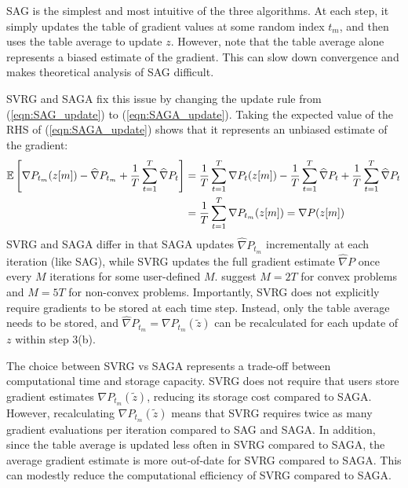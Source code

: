 SAG is the simplest and most intuitive of the three algorithms. At each step, it simply updates the table of gradient values at some random index $t_m$, and then uses the table average to update $z$. However, note that the table average alone represents a biased estimate of the gradient. This can slow down convergence and makes theoretical analysis of SAG difficult.

SVRG and SAGA fix this issue by changing the update rule from (\ref{eqn:SAG_update}) to (\ref{eqn:SAGA_update}). Taking the expected value of the RHS of (\ref{eqn:SAGA_update}) shows that it represents an unbiased estimate of the gradient:
%
\begin{align*}
    \mathbb{E}\left[\nabla P_{t_m}(z[m]) - \widehat \nabla P_{t_m} + \frac{1}{T} \sum_{t=1}^T \widehat \nabla P_{t} \right] &= \frac{1}{T} \sum_{t=1}^T \nabla P_{t}(z[m]) - \frac{1}{T} \sum_{t=1}^T \widehat \nabla P_{t} + \frac{1}{T} \sum_{t=1}^T \widehat \nabla P_{t} \\
    &= \frac{1}{T} \sum_{t=1}^T \nabla P_{t_m}(z[m]) = \nabla P(z[m])
\end{align*}
%
SVRG and SAGA differ in that SAGA updates $\widehat \nabla P_{t_m}$ incrementally at each iteration (like SAG), while SVRG updates the full gradient estimate $\widehat \nabla P$ once every $M$ iterations for some user-defined $M$. \citet{Johnson:2013} suggest $M = 2T$ for convex problems and $M = 5T$ for non-convex problems. Importantly, SVRG does not explicitly require gradients to be stored at each time step. Instead, only the table average needs to be stored, and $\widehat \nabla P_{t_m} = \nabla P_{t_m}(\tilde z)$ can be recalculated for each update of $z$ within step 3(b). 

The choice between SVRG vs SAGA represents a trade-off between computational time and storage capacity. SVRG does not require that users store gradient estimates $\nabla P_{t_m}(\tilde z)$, reducing its storage cost compared to SAGA. However, recalculating $\nabla P_{t_m}(\tilde z)$ means that SVRG requires twice as many gradient evaluations per iteration compared to SAG and SAGA. In addition, since the table average is updated less often in SVRG compared to SAGA, the average gradient estimate is more out-of-date for SVRG compared to SAGA. This can modestly reduce the computational efficiency of SVRG compared to SAGA.
